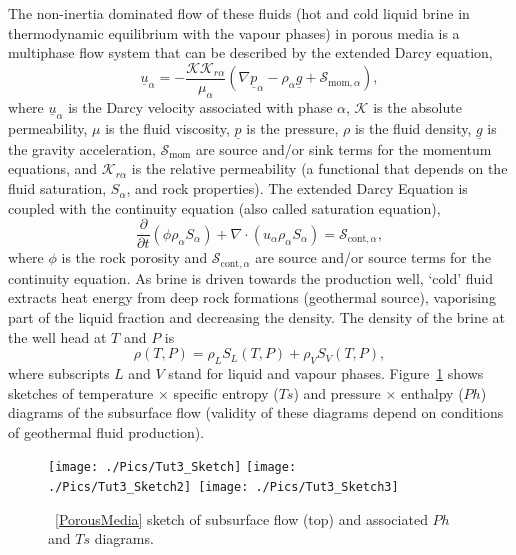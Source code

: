 \documentclass[12pts,a4paper,amsmath,amssymb,floatfix]{article}%
\newcommand{\frc}{\displaystyle\frac}
\begin{document}
\begin{enumerate}[label=\bfseries Problem \arabic*:]
\begin{enumerate}
      The non-inertia dominated flow of these fluids (hot and cold liquid brine in thermodynamic equilibrium with the vapour phases) in porous media is a multiphase flow system that can be described by the extended Darcy equation,
      \begin{equation}
        \underline{u}_{\alpha} = -\frc{\mathcal{K}\mathcal{K}_{r\alpha}}{\mu_{\alpha}}\left(\nabla \underline{p}_{\alpha} - \rho_{\alpha}\underline{g} + \mathcal{S}_{\text{mom},\alpha}\right),
      \end{equation}
      where $\underline{u}_{\alpha}$ is the Darcy velocity associated with phase $\alpha$, $\mathcal{K}$ is the absolute permeability, $\mu$ is the fluid viscosity, $\underline{p}$ is the pressure, $\rho$ is the fluid density, $\underline{g}$ is the gravity acceleration, $\mathcal{S}_{\text{mom}}$ are source and/or sink terms for the momentum equations, and $\mathcal{K}_{r\alpha}$ is the relative permeability (a functional that depends on the fluid saturation, $S_{\alpha}$, and rock properties). The extended Darcy Equation is coupled with the continuity equation (also called saturation equation),
      \begin{equation}
        \frc{\partial}{\partial t}\left(\phi\rho_{\alpha}S_{\alpha}\right) + \nabla\cdot\left(u_{\alpha}\rho_{\alpha}S_{\alpha}\right) = \mathcal{S}_{\text{cont},\alpha},
      \end{equation}
      where $\phi$ is the rock porosity and $\mathcal{S}_{\text{cont},\alpha}$ are source and/or source terms for the continuity equation. As brine is driven towards the production well, `cold' fluid extracts heat energy from deep rock formations (geothermal source), vaporising part of the liquid fraction and decreasing the density. The density of the brine at the well head at $T$ and $P$ is
      \begin{equation}
          \rho\left(T,P\right) = \rho_{L}S_{L}\left(T,P\right) +  \rho_{V}S_{V}\left(T,P\right),
      \end{equation} 
      where subscripts $L$ and $V$ stand for liquid and vapour phases. Figure~\ref{SolutionProb1} shows sketches of temperature $\times$ specific entropy ($Ts$) and pressure $\times$ enthalpy ($Ph$) diagrams of the subsurface flow (validity of these diagrams depend on conditions of geothermal fluid production). 
      \begin{figure}[h]
        \vbox{
          \hbox{\texttt{[image: ./Pics/Tut3\_Sketch]}}
           \vspace{0.cm}
           \hbox{\texttt{[image: ./Pics/Tut3\_Sketch2]}
                 \texttt{[image: ./Pics/Tut3\_Sketch3]}}}
        \caption{~\ref{PorousMedia} sketch of subsurface flow (top) and associated $Ph$ and $Ts$ diagrams.}\label{SolutionProb1}
      \end{figure}
      

\end{enumerate}
\end{enumerate}
\end{document}
